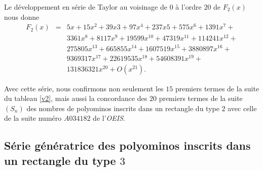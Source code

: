 Le développement  en série de Taylor au voisinage de $0$ à l'ordre $20$ de $F_{2}(x)$ nous donne
\begin{eqnarray*}
F_{2}(x)& = & 5x+15x^2+39x3+97x^4+237x5+575x^6+1391x^7+\\ & & 3361x^8+8117x^9+
19599x^{10}+47319x^{11}+114241x^{12}+\\ & & 275805x^{13}+665855x^{14}+1607519x^{15}+
3880897x^{16}+\\ & & 9369317x^{17}+22619535x^{18}+54608391x^{19}+\\
& & 131836321x^{20}+O(x^{21}).
\end{eqnarray*}

Avec cette série, nous confirmons non seulement les $15$ premiers termes de la suite du tableau \ref{v2}, mais aussi la concordance  des $20$ premiers termes de la suite $(S_{n})$ des nombres de polyominos inscrits dans un rectangle du type $2$ avec celle de la suite numéro $A034182 $ de l'\emph{OEIS}.

\subsection{Série génératrice des polyominos inscrits dans un rectangle du type $3$}

